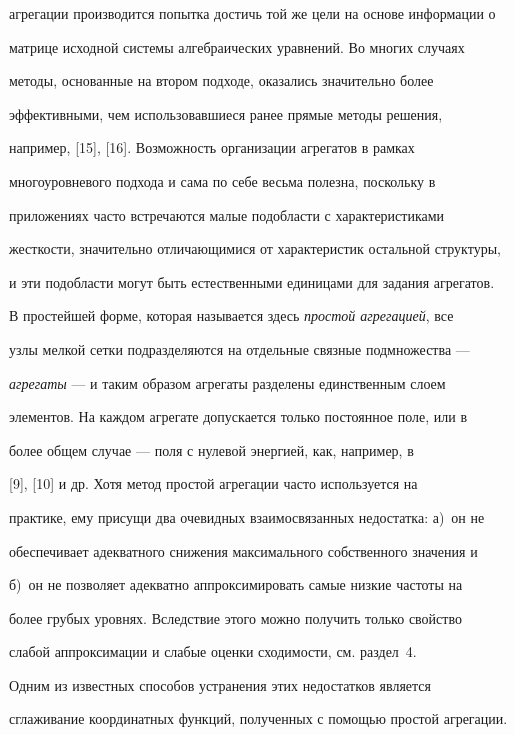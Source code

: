 агрегации производится попытка достичь той же цели на основе информации о


матрице исходной системы алгебраических уравнений. Во многих случаях


методы, основанные на втором подходе, оказались значительно более


эффективными, чем использовавшиеся ранее прямые методы решения,


например, [15], [16]. Возможность организации агрегатов в рамках


многоуровневого подхода и сама по себе весьма полезна, поскольку в


приложениях часто встречаются малые подобласти с характеристиками


жесткости, значительно отличающимися от характеристик остальной структуры,


и эти подобласти могут быть естественными единицами для задания агрегатов.





В простейшей форме, которая называется здесь {\em простой агрегацией}, все


узлы мелкой сетки подразделяются на отдельные связные подмножества ---


{\em агрегаты} --- и таким образом агрегаты разделены единственным слоем


элементов. На каждом агрегате допускается только постоянное поле, или в


более общем случае --- поля с нулевой энергией, как, например, в


[9], [10] и др. Хотя метод простой агрегации часто используется на


практике, ему присущи два очевидных взаимосвязанных недостатка: а)~он не


обеспечивает адекватного снижения максимального собственного значения и


б)~он не позволяет адекватно аппроксимировать самые низкие частоты на


более грубых уровнях. Вследствие этого можно получить только свойство


слабой аппроксимации и слабые оценки сходимости, см. раздел~4.





Одним из известных способов устранения этих недостатков является


сглаживание координатных функций, полученных с помощью простой агрегации.


